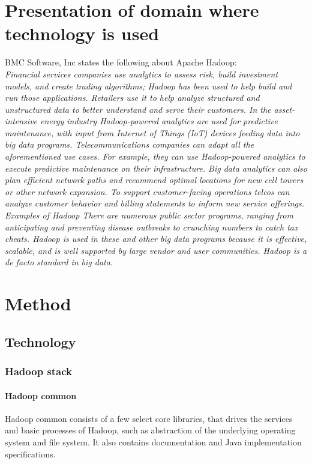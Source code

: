 \documentclass[a4paper,english]{report}
\begin{document}
		
	\chapter{Presentation of domain where technology is used}
		BMC Software, Inc states the following about Apache Hadoop:\\
		\emph{Financial services companies use analytics to assess risk, build investment models, and create trading algorithms; Hadoop has been used to help build and run those applications.
		Retailers use it to help analyze structured and unstructured data to better understand and serve their customers.
		In the asset-intensive energy industry Hadoop-powered analytics are used for predictive maintenance, with input from Internet of Things (IoT) devices feeding data into big data programs.
		Telecommunications companies can adapt all the aforementioned use cases. For example, they can use Hadoop-powered analytics to execute predictive maintenance on their infrastructure. Big data analytics can also plan efficient network paths and recommend optimal locations for new cell towers or other network expansion. To support customer-facing operations telcos can analyze customer behavior and billing statements to inform new service offerings. Examples of Hadoop
		There are numerous public sector programs, ranging from anticipating and preventing disease outbreaks to crunching numbers to catch tax cheats.
		Hadoop is used in these and other big data programs because it is effective, scalable, and is well supported by large vendor and user communities. Hadoop is a de facto standard in big data.}\cite{bmc}
		

	
	
	\chapter{Method}
		
		\section{Technology}
			
			\subsection{Hadoop stack}
				
				\subsubsection{Hadoop common}
					Hadoop common consists of a few select core libraries, that drives the services and basic processes of Hadoop, such as abstraction of the underlying operating system and file system. It also contains documentation and Java implementation specifications. 
				
\end{document}
